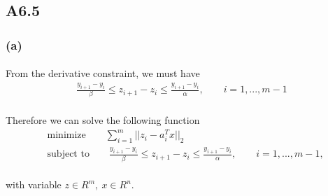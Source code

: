 \subsection*{A6.5}
\subsubsection*{(a)}
\paragraph{}
From the derivative constraint, we must have
\begin{align*}
\frac{y_{i+1}-y_i}{\beta} \leq z_{i+1} - z_i \leq \frac{y_{i+1}-y_i}{\alpha}, \qquad i =1,...,m-1 
\end{align*}
\paragraph{}
Therefore we can solve the following function
\begin{align*}
&\text{minimize}\qquad \sum_{i=1}^{m}||z_i - a_i^Tx||_2 \\
&\text{subject to}\qquad \frac{y_{i+1}-y_i}{\beta} \leq z_{i+1} - z_i \leq \frac{y_{i+1}-y_i}{\alpha}, \qquad i =1,...,m-1, 
\end{align*}
\paragraph{}
with variable $z \in R^m,\ x \in R^n$.
